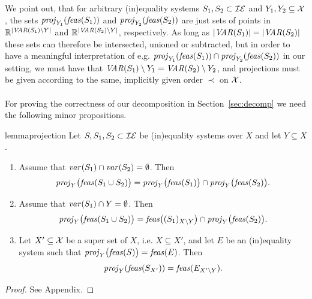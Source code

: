 We point out, that for arbitrary (in)equality systems $S_1,S_2\subset \mathcal{IE}$ and $Y_1,Y_2\subseteq \mathcal{X}$, the sets $\mathit{proj}_{Y_1}(\mathit{feas}(S_1))$ and $\mathit{proj}_{Y_2}(\mathit{feas}(S_2))$ are just sets of points in $\mathbb{R}^{|\mathit{VAR}(S_1)\setminus Y|}$ and $\mathbb{R}^{|\mathit{VAR}(S_2)\setminus Y|}$, respectively. As long as $|\mathit{VAR}(S_1)|=|\mathit{VAR}(S_2)|$ these sets can therefore be intersected, unioned or subtracted, but in order to have a meaningful interpretation of 
e.g. $\mathit{proj}_{Y_1}(\mathit{feas}(S_1))\cap\mathit{proj}_{Y_2}(\mathit{feas}(S_2))$ in our setting, we must have that $\mathit{VAR}(S_1)\setminus Y_1 = \mathit{VAR}(S_2)\setminus Y_2$, and projections must be given according to the same, implicitly given order $\prec$ on $\mathcal{X}$.
%
\\\\
For proving the correctness of our decomposition in Section~\ref{sec:decomp} we need the following minor propositions.
\begin{restatable}{lemma}{projection}\label{lm:projection}
Let $S, S_1, S_2\subset\mathcal{IE}$ be (in)equality systems over $X$ and let $Y\subseteq X$. 
\begin{enumerate}
\item\label{lm:1.1} Assume that $\mathit{var}(S_1)\cap\mathit{var}(S_2) = \emptyset$. Then 
\begin{equation}\label{eq:lm1.1}
\mathit{proj}_Y\big(\mathit{feas}(S_1\cup S_2)\big) = \mathit{proj}_Y\big(\mathit{feas}(S_1)\big)\cap \mathit{proj}_Y\big(\mathit{feas}(S_2)\big).
\end{equation}
\item\label{lm:1.2} Assume that $\mathit{var}(S_1)\cap Y = \emptyset$. Then
\begin{equation}
\mathit{proj}_Y\big(\mathit{feas}(S_1\cup S_2)\big) = \mathit{feas}\big((S_1)_{X\setminus Y}\big)\cap \mathit{proj}_Y\big(\mathit{feas}(S_2)\big).
\end{equation}
\item\label{lm:1.3} Let $X'\subseteq \mathcal{X}$ be a super set of $X$, i.e. $X\subseteq X'$, and let $E$ be an (in)equality system such that $\mathit{proj}_Y\big(\mathit{feas}(S)\big) = \mathit{feas}(E)$.
Then 
\[
\mathit{proj}_Y(\mathit{feas}(S_{X'})) = \mathit{feas}(E_{X'\setminus Y}).
\]
\end{enumerate}
\end{restatable}
\begin{proof} See Appendix.
\end{proof}